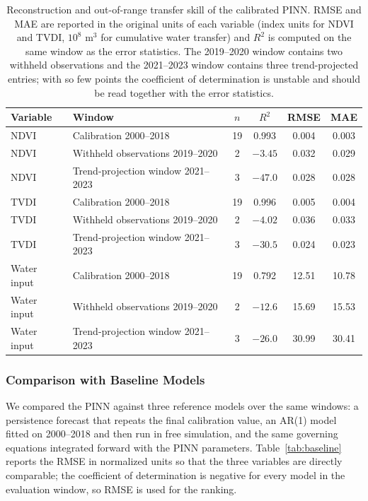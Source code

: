 \documentclass[preprint,review,12pt,3p]{elsarticle}
\begin{document}
\begin{table}[H]
	\centering
	\caption{Reconstruction and out-of-range transfer skill of the calibrated PINN. RMSE and MAE are reported in the original units of each variable (index units for NDVI and TVDI, $10^{8}$ m$^{3}$ for cumulative water transfer) and $R^2$ is computed on the same window as the error statistics. The 2019--2020 window contains two withheld observations and the 2021--2023 window contains three trend-projected entries; with so few points the coefficient of determination is unstable and should be read together with the error statistics.}
	\label{tab:holdout}
	\small
	\begin{tabular}{llcccc}
		\toprule
		Variable & Window & $n$ & $R^2$ & RMSE & MAE \\
		\midrule
		NDVI & Calibration 2000--2018 & 19 & 0.993 & 0.004 & 0.003 \\
		NDVI & Withheld observations 2019--2020 & 2 & $-3.45$ & 0.032 & 0.029 \\
		NDVI & Trend-projection window 2021--2023 & 3 & $-47.0$ & 0.028 & 0.028 \\
		TVDI & Calibration 2000--2018 & 19 & 0.996 & 0.005 & 0.004 \\
		TVDI & Withheld observations 2019--2020 & 2 & $-4.02$ & 0.036 & 0.033 \\
		TVDI & Trend-projection window 2021--2023 & 3 & $-30.5$ & 0.024 & 0.023 \\
		Water input & Calibration 2000--2018 & 19 & 0.792 & 12.51 & 10.78 \\
		Water input & Withheld observations 2019--2020 & 2 & $-12.6$ & 15.69 & 15.53 \\
		Water input & Trend-projection window 2021--2023 & 3 & $-26.0$ & 30.99 & 30.41 \\
		\bottomrule
	\end{tabular}
\end{table}

\subsubsection{Comparison with Baseline Models}

We compared the PINN against three reference models over the same windows: a persistence forecast that repeats the final calibration value, an AR(1) model fitted on 2000--2018 and then run in free simulation, and the same governing equations integrated forward with the PINN parameters. Table~\ref{tab:baseline} reports the RMSE in normalized units so that the three variables are directly comparable; the coefficient of determination is negative for every model in the evaluation window, so RMSE is used for the ranking.
\end{document}
